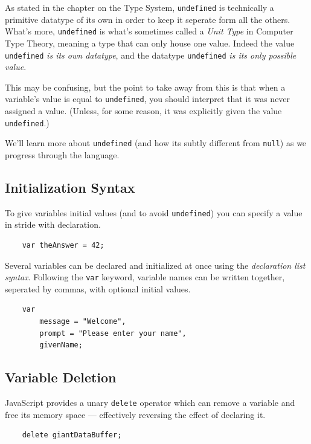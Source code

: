 \documentclass[11pt,letter]{book}
\begin{document}
    As stated in the chapter on the Type System, \texttt{undefined} is technically a primitive 
    datatype of its own in order to keep it seperate form all the others. What's more, 
    \texttt{undefined} is what's sometimes called a \emph{Unit Type} in Computer Type Theory, 
    meaning a type that can only house one value. Indeed the value \texttt{undefined} \emph{is its 
    own datatype}, and the datatype \texttt{undefined} \emph{is its only possible value}.
    
    This may be confusing, but the point to take away from this is that when a variable's value is
    equal to \texttt{undefined}, you should interpret that it was never assigned a value. (Unless, 
    for some reason, it was explicitly given the value \texttt{undefined}.)
    
    We'll learn more about \texttt{undefined} (and how its subtly different from \texttt{null}) as 
    we progress through the language.
    
    \subsection{Initialization Syntax}
    To give variables initial values (and to avoid \texttt{undefined}) you can specify a value in 
    stride with declaration.
    
    \begin{verbatim}
    var theAnswer = 42;
    \end{verbatim}
    
    Several variables can be declared and initialized at once using the \emph{declaration list 
    syntax}. Following the \texttt{var} keyword, variable names can be written together, seperated 
    by commas, with optional initial values.
    
    \begin{verbatim}
    var 
        message = "Welcome",
        prompt = "Please enter your name",
        givenName;
    \end{verbatim}
    
    \subsection{Variable Deletion}
    JavaScript provides a unary \texttt{delete} operator which can remove a variable and free its 
    memory space --- effectively reversing the effect of declaring it.
    
    \begin{verbatim}
    delete giantDataBuffer;
    \end{verbatim}
    
\end{document}
